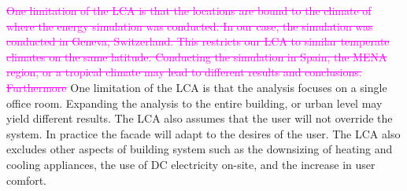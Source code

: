 \textcolor{magenta}{\sout{One limitation of the LCA is that the locations are bound to the climate of where the energy simulation was conducted. In our case, the simulation was conducted in Geneva, Switzerland. This restricts our LCA to similar temperate climates on the same latitude. Conducting the simulation in Spain, the MENA region, or a tropical climate may lead to different results and conclusions. Furthermore }} 
One limitation of the LCA is that the analysis focuses on a single office room. Expanding the analysis to the entire building, or urban level may yield different results. The LCA also assumes that the user will not override the system. In practice the facade will adapt to the desires of the user. 
The LCA also excludes other aspects of building system such as the downsizing of heating and cooling appliances, the use of DC electricity on-site, and the increase in user comfort.



